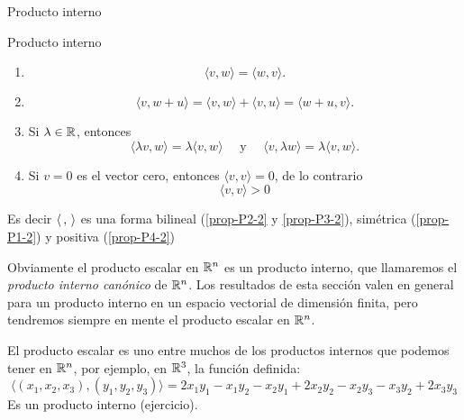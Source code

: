 \begin{chapter}{Producto interno}
\begin{section}{Producto interno}
\begin{definicion}
            \begin{enumerate}[label=\textbf{P\arabic*.},ref=P\arabic*]
                \item\label{prop-P1-2}
                \begin{equation*}
                    \langle v , w \rangle = \langle w , v \rangle.
                \end{equation*} 	
                \item\label{prop-P2-2} 
                \begin{equation*}
                \langle v , w + u \rangle =\langle v , w \rangle + \langle v , u \rangle = \langle w +u , v \rangle.
                \end{equation*}
                \item\label{prop-P3-2}  Si $\lambda \in \mathbb R$, entonces 
                \begin{equation*}
                \langle \lambda v , w \rangle = \lambda \langle v , w \rangle \quad \text{ y } \quad  \langle v , \lambda w \rangle = \lambda \langle v , w \rangle.
                \end{equation*}
                \item\label{prop-P4-2} Si $v=0$ es el vector cero, entonces $\langle v , v \rangle =0$,  de lo contrario
                \begin{equation*}
                \langle v , v \rangle >0
                \end{equation*}
            \end{enumerate}
            Es decir  $\langle \,,\,\rangle$ es una forma bilineal (\ref{prop-P2-2} y \ref{prop-P3-2}),  simétrica (\ref{prop-P1-2}) y positiva (\ref{prop-P4-2})
        \end{definicion}
    
        
        Obviamente el producto escalar en $\mathbb R^n$  es un producto interno,  que llamaremos  el  \textit{producto interno canónico} de $\mathbb R^n$. Los resultados de esta sección valen en general para un producto interno en un espacio vectorial de dimensión finita, pero tendremos siempre en mente el producto escalar en $\mathbb R^n$. 

            \begin{ejemplo*} El producto escalar es uno entre  muchos de los productos internos que podemos tener en $\mathbb R^n$, por ejemplo,  en $\mathbb R^3$,  la función definida:
                \begin{equation*}
                    \langle (x_1,x_2,x_3) , (y_1,y_2,y_3)\rangle =2x_1y_1-x_1y_2-x_2y_1+2x_2y_2-x_2y_3-x_3y_2+2x_3y_3
                \end{equation*}
                Es un producto interno (ejercicio).
            \end{ejemplo*}
        

\end{section}
\end{chapter}
